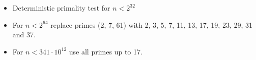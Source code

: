 \begin{itemize}
	\item Deterministic primality test for $n < 2^{32}$
	\item For $n < 2^{64}$ replace primes (2, 7, 61) with 2, 3, 5, 7, 11, 13, 17, 19, 23, 29, 31 and 37.
	\item For $n < 341 \cdot 10^{12}$ use all primes up to 17.
\end{itemize}
